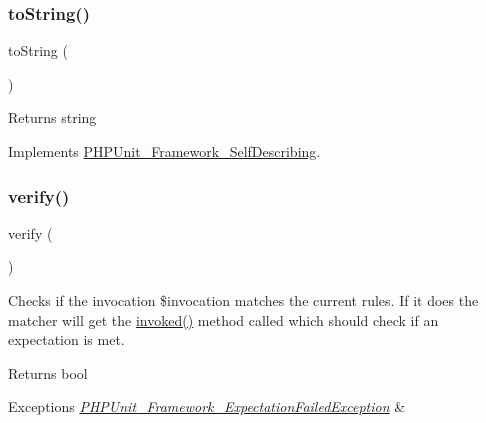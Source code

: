 \subsubsection{\texorpdfstring{to\+String()}{toString()}}
{\footnotesize\ttfamily to\+String (\begin{DoxyParamCaption}{ }\end{DoxyParamCaption})}

\begin{DoxyReturn}{Returns}
string 
\end{DoxyReturn}


Implements \mbox{\hyperlink{interface_p_h_p_unit___framework___self_describing_a5558c5d549f41597377fa1ea8a1cefa3}{P\+H\+P\+Unit\+\_\+\+Framework\+\_\+\+Self\+Describing}}.

\mbox{\label{class_p_h_p_unit___framework___mock_object___matcher___parameters_aa33600b6a1b28d0c4dfe4d468272aaa4}} 
\subsubsection{\texorpdfstring{verify()}{verify()}}
{\footnotesize\ttfamily verify (\begin{DoxyParamCaption}{ }\end{DoxyParamCaption})}

Checks if the invocation \$invocation matches the current rules. If it does the matcher will get the \mbox{\hyperlink{class_p_h_p_unit___framework___mock_object___matcher___stateless_invocation_a63f37b06181c9547bc3c225007c34425}{invoked()}} method called which should check if an expectation is met.

\begin{DoxyReturn}{Returns}
bool
\end{DoxyReturn}

\begin{DoxyExceptions}{Exceptions}
{\em \mbox{\hyperlink{class_p_h_p_unit___framework___expectation_failed_exception}{P\+H\+P\+Unit\+\_\+\+Framework\+\_\+\+Expectation\+Failed\+Exception}}} & \\
\hline
\end{DoxyExceptions}


